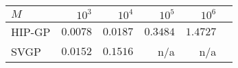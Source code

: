 \begin{tabular}{lrrrrr}
\toprule
$M$ &     $10^3$       & $10^4$     & $10^5$     & $10^6$  \\
\midrule
HIP-GP   &  $\mathbf{0.0078}$  &  $\mathbf{0.0187}$  &  $\mathbf{0.3484}$  &  $\mathbf{1.4727}$  \\
SVGP     &  $0.0152$ &   $0.1516$  &   n/a      & n/a       \\ 
\bottomrule
\end{tabular}
